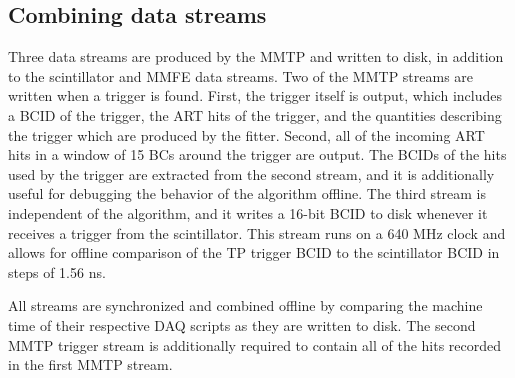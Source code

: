 

\subsection{Combining data streams}
\label{sec:data-streams}

Three data streams are produced by the MMTP and written to disk, in addition to the scintillator and MMFE data streams. Two of the MMTP streams are written when a trigger is found. First, the trigger itself is output, which includes a BCID of the trigger, the ART hits of the trigger, and the quantities describing the trigger which are produced by the fitter. Second, all of the incoming ART hits in a window of 15 BCs around the trigger are output. The BCIDs of the hits used by the trigger are extracted from the second stream, and it is additionally useful for debugging the behavior of the algorithm offline. The third stream is independent of the algorithm, and it writes a 16-bit BCID to disk whenever it receives a trigger from the scintillator. This stream runs on a 640 MHz clock and allows for offline comparison of the TP trigger BCID to the scintillator BCID in steps of 1.56 ns.

All streams are synchronized and combined offline by comparing the machine time of their respective DAQ scripts as they are written to disk. The second MMTP trigger stream is additionally required to contain all of the hits recorded in the first MMTP stream.

